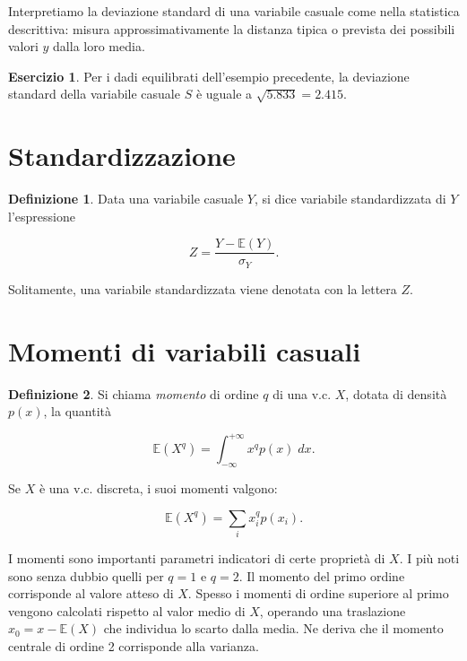 \documentclass[
  11pt,
]{krantz}
\newcommand{\E}{\mathbb{E}} %
\theoremstyle{definition}
\newtheorem{definition}{Definizione}[chapter]
\theoremstyle{definition}
\theoremstyle{definition}
\newtheorem{exercise}{Esercizio}[chapter]
\theoremstyle{definition}
\theoremstyle{remark}
\begin{document}
Interpretiamo la deviazione standard di una variabile casuale come nella statistica descrittiva: misura approssimativamente la distanza tipica o prevista dei possibili valori \(y\) dalla loro media.

\begin{exercise}
Per i dadi equilibrati dell'esempio precedente, la deviazione standard della variabile casuale \(S\) è uguale a \(\sqrt{5.833} = 2.415\).
\end{exercise}

\hypertarget{standardizzazione}{%
\section{Standardizzazione}\label{standardizzazione}}

\begin{definition}
Data una variabile casuale \(Y\), si dice variabile standardizzata di \(Y\) l'espressione

\begin{equation}
Z = \frac{Y - \E(Y)}{\sigma_Y}.
\label{eq:standardization}
\end{equation}
\end{definition}

Solitamente, una variabile standardizzata viene denotata con la lettera \(Z\).

\hypertarget{momenti-di-variabili-casuali}{%
\section{Momenti di variabili casuali}\label{momenti-di-variabili-casuali}}

\begin{definition}
Si chiama \emph{momento} di ordine \(q\) di una v.c. \(X\), dotata di densità \(p(x)\), la quantità

\begin{equation}
\E(X^q) = \int_{-\infty}^{+\infty} x^q p(x) \; dx.
\end{equation}

Se \(X\) è una v.c. discreta, i suoi momenti valgono:

\begin{equation}
\E(X^q) = \sum_i x_i^q p(x_i).
\end{equation}
\end{definition}

I momenti sono importanti parametri indicatori di certe proprietà di \(X\). I più noti sono senza dubbio quelli per \(q = 1\) e \(q = 2\). Il momento del primo ordine corrisponde al valore atteso di \(X\). Spesso i momenti di ordine superiore al primo vengono calcolati rispetto al valor medio di \(X\), operando una traslazione \(x_0 = x − \E(X)\) che individua lo scarto dalla media. Ne deriva che il momento centrale di ordine 2 corrisponde alla varianza.
\end{document}
